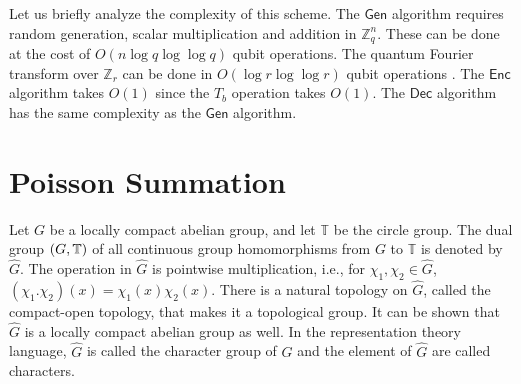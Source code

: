 \documentclass[11pt]{article}
\theoremstyle{plain}
\theoremstyle{definition}
\let\hom\relax
\DeclareMathOperator{\hom}{Hom}
\def\Z{\mathbb{Z}}
\def\gen{\mathsf{Gen}}
\def\enc{\mathsf{Enc}}
\def\dec{\mathsf{Dec}}
\begin{document}
Let us briefly analyze the complexity of this scheme. The $\gen$ algorithm requires random generation, scalar multiplication and addition in $\Z_q^n$. These can be done at the cost of $O(n\log q \log\log q)$ qubit operations. The quantum Fourier transform over $\Z_r$ can be done in $O(\log r\log\log r)$ qubit operations \cite{hales2000improved}. The $\enc$ algorithm takes $O(1)$ since the $T_b$ operation takes $O(1)$. The $\dec$ algorithm has the same complexity as the $\gen$ algorithm.













\newpage
\appendix

\section{Poisson Summation}
Let $G$ be a locally compact abelian group, and let $\mathbb{T}$ be the circle group. The dual group $\hom(G, \mathbb{T})$ of all continuous group homomorphisms from $G$ to $\mathbb{T}$ is denoted by $\widehat{G}$. The operation in $\widehat{G}$ is pointwise multiplication, i.e., for $\chi_1, \chi_2 \in \widehat{G}$, $(\chi_1 . \chi_2)(x) = \chi_1(x)\chi_2(x)$. There is a natural topology on $\widehat{G}$, called the compact-open topology, that makes it a topological group. It can be shown that $\widehat{G}$ is a locally compact abelian group as well. In the representation theory language, $\widehat{G}$ is called the character group of $G$ and the element of $\widehat{G}$ are called characters. 
\end{document}
